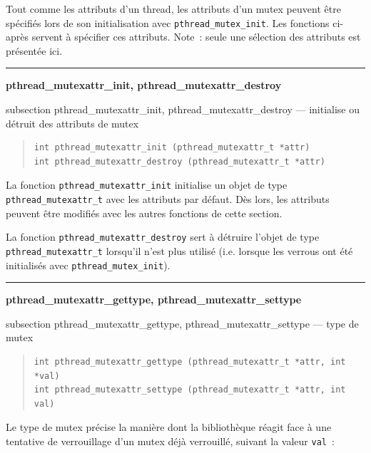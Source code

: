 \documentclass [twoside] {report}
\newcommand {\primitive} [1]
    {
	\phantomsection
	{\large \textbf {#1}}
	\addcontentsline {toc} {subsection} {#1}
    }
\newcommand {\separation}
    {
	\vspace {5mm}
	\nopagebreak
	\hrule
    }
\begin{document}
Tout comme les attributs d'un thread, les attributs d'un
mutex peuvent être spécifiés lors de son initialisation avec
\verb|pthread_mutex_init|. Les fonctions ci-après servent à spécifier
ces attributs.
Note~: seule une sélection des attributs est présentée ici.

\separation
\primitive {pthread\_mutexattr\_init, pthread\_mutexattr\_destroy} ---
initialise ou détruit des attributs de mutex

\begin {quote}
\begin {verbatim}
int pthread_mutexattr_init (pthread_mutexattr_t *attr)
int pthread_mutexattr_destroy (pthread_mutexattr_t *attr)
\end{verbatim}
\end {quote}

La fonction \verb|pthread_mutexattr_init| initialise un objet de type
\verb|pthread_mutexattr_t| avec les attributs par défaut. Dès lors, les
attributs peuvent être modifiés avec les autres fonctions de cette
section.

La fonction \verb|pthread_mutexattr_destroy| sert à détruire l'objet de type
\verb|pthread_mutexattr_t| lorsqu'il n'est plus utilisé (i.e.  lorsque les
verrous ont été initialisés avec \verb|pthread_mutex_init|).


\separation
\primitive {pthread\_mutexattr\_gettype, pthread\_mutexattr\_settype} --- type de mutex

\begin {quote}
\begin {verbatim}
int pthread_mutexattr_gettype (pthread_mutexattr_t *attr, int *val)
int pthread_mutexattr_settype (pthread_mutexattr_t *attr, int val)
\end{verbatim}
\end {quote}

Le type de mutex précise la manière dont la bibliothèque réagit
face à une tentative de verrouillage d'un mutex déjà verrouillé,
suivant la valeur \texttt {val}~:
\end{document}
